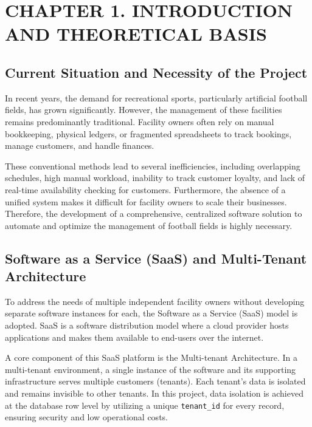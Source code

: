 \section*{CHAPTER 1. INTRODUCTION AND THEORETICAL BASIS}
\setcounter{section}{1}
\setcounter{subsection}{0}
\setcounter{figure}{0}
\setcounter{table}{0}

\subsection{Current Situation and Necessity of the Project}
In recent years, the demand for recreational sports, particularly artificial football fields, has grown significantly. However, the management of these facilities remains predominantly traditional. Facility owners often rely on manual bookkeeping, physical ledgers, or fragmented spreadsheets to track bookings, manage customers, and handle finances. 

These conventional methods lead to several inefficiencies, including overlapping schedules, high manual workload, inability to track customer loyalty, and lack of real-time availability checking for customers. Furthermore, the absence of a unified system makes it difficult for facility owners to scale their businesses. Therefore, the development of a comprehensive, centralized software solution to automate and optimize the management of football fields is highly necessary.

\subsection{Software as a Service (SaaS) and Multi-Tenant Architecture}
To address the needs of multiple independent facility owners without developing separate software instances for each, the Software as a Service (SaaS) model is adopted. SaaS is a software distribution model where a cloud provider hosts applications and makes them available to end-users over the internet.

A core component of this SaaS platform is the Multi-tenant Architecture. In a multi-tenant environment, a single instance of the software and its supporting infrastructure serves multiple customers (tenants). Each tenant's data is isolated and remains invisible to other tenants. In this project, data isolation is achieved at the database row level by utilizing a unique \texttt{tenant\_id} for every record, ensuring security and low operational costs.

